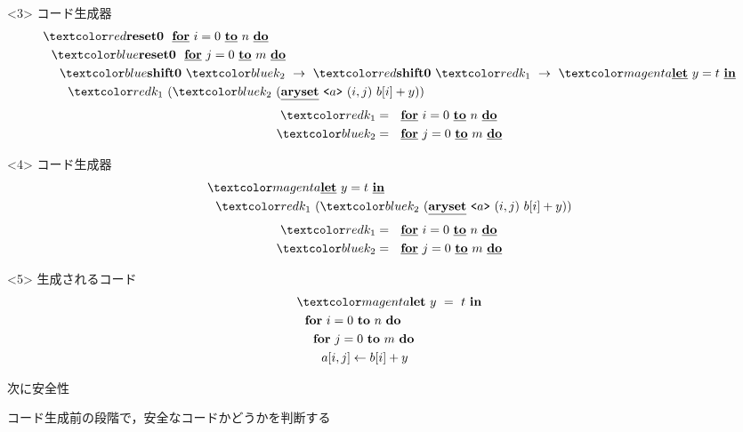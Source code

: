 \begin{frame}
  \begin{onlyenv}<3>
    コード生成器
    \begin{align*}
      & \red{\Resetz} ~~\cfordo{i = 0}{n} \\
      & ~~\blue{\Resetz} ~~\cfordo{j = 0}{m} \\
      & ~~~~\blue{\Shiftz}~\blue{k_2}~\to~ \red{\Shiftz}~\red{k_1}~\to~ \magenta{\cLet~y=t~\cIn} \\
      & ~~~~~~\red{k_1}~(\blue{k_2}~(\caryset{\code{a}}{(i,j)}{b[i] + y}))
    \end{align*}
    \begin{align*}
      \red{k_1} &= ~~\cfordo{i = 0}{n} \\
      \blue{k_2} &= ~~\cfordo{j = 0}{m} \\
    \end{align*}
  \end{onlyenv}

  \begin{onlyenv}<4>
    コード生成器
    \begin{align*}
      & \magenta{\cLet~y=t~\cIn} \\
      & ~~\red{k_1}~(\blue{k_2}~(\caryset{\code{a}}{(i,j)}{b[i] + y}))
    \end{align*}
    \begin{align*}
      \red{k_1} &= ~~\cfordo{i = 0}{n} \\
      \blue{k_2} &= ~~\cfordo{j = 0}{m} \\
    \end{align*}
  \end{onlyenv}

  \begin{onlyenv}<5>
    生成されるコード
    \begin{align*}
      & \magenta{\Let ~y ~= ~t ~\In} \\
      & ~~\fordo{i = 0}{n} \\
      & ~~~~\fordo{j = 0}{m} \\
      & ~~~~~~\aryset{a}{i,j}{b[i] + y} \\
    \end{align*}
  \end{onlyenv}
\end{frame}

\begin{frame}
  \center
  \huge{次に安全性}
\end{frame}

\begin{frame}
  \center
  \huge{コード生成前の段階で，安全なコードかどうかを判断する}
\end{frame}

